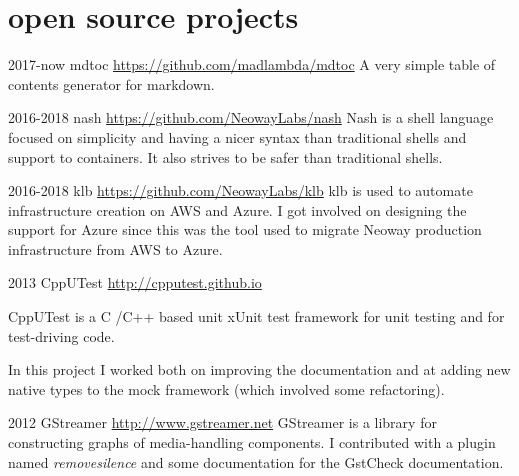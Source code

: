 \documentclass[]{friggeri-cv} %
\begin{document}

\pagebreak
\section{open source projects}

\begin{entrylist}
\entry
{2017-now}
{mdtoc}
{\href{https://github.com/madlambda/mdtoc}{https://github.com/madlambda/mdtoc}}
{
A very simple table of contents generator for markdown.
}
\end{entrylist}

\begin{entrylist}
\entry
{2016-2018}
{nash}
{\href{https://github.com/NeowayLabs/nash}{https://github.com/NeowayLabs/nash}}
{
Nash is a shell language focused on simplicity and having a nicer syntax
than traditional shells and support to containers. It also strives to be
safer than traditional shells.
}
\end{entrylist}

\begin{entrylist}
\entry
{2016-2018}
{klb}
{\href{https://github.com/NeowayLabs/klb}{https://github.com/NeowayLabs/klb}}
{
klb is used to automate infrastructure creation on AWS and Azure.
I got involved on designing the support for Azure since this was
the tool used to migrate Neoway production infrastructure from
AWS to Azure.
}
\end{entrylist}

\begin{entrylist}
\entry
{2013}
{CppUTest}
{\href{http://cpputest.github.io}{http://cpputest.github.io}}
{
CppUTest is a C /C++ based unit xUnit test framework for unit
testing and for test-driving code.

In this project I worked both on improving the documentation and
at adding new native types to the mock framework (which involved
some refactoring).
}
\end{entrylist}

\begin{entrylist}
\entry
{2012}
{GStreamer}
{\href{http://www.gstreamer.net}{http://www.gstreamer.net}}
{
GStreamer is a library for constructing graphs of
media-handling components. I contributed with a plugin
named \emph{removesilence} and some documentation for the
GstCheck documentation.
}
\end{entrylist}
\end{document}
